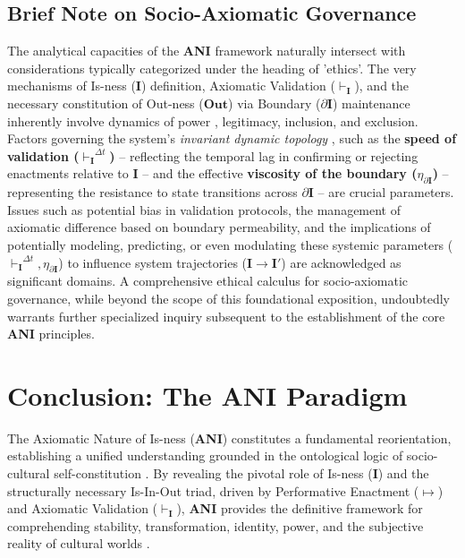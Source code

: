 \documentclass{article}
\newcommand{\ANI}{\textbf{ANI}}             %
\newcommand{\Isness}{\mathbf{I}}            %
\newcommand{\Outness}{\mathbf{Out}}         %
\newcommand{\enactment}{\ensuremath{\mapsto}} %
\newcommand{\validates}[1]{\ensuremath{\vdash_{#1}}} %
\newcommand{\boundary}[1]{\ensuremath{\partial #1}} %
\begin{document}
\subsection{Brief Note on Socio-Axiomatic Governance}

The analytical capacities of the \ANI{} framework naturally intersect with considerations typically categorized under the heading of 'ethics'. The very mechanisms of Is-ness ($\Isness$) definition, Axiomatic Validation ($\validates{\Isness}$), and the necessary constitution of Out-ness ($\Outness$) via Boundary ($\boundary{\Isness}$) maintenance inherently involve dynamics of power \citep{Foucault1972}, legitimacy, inclusion, and exclusion. Factors governing the system's \textit{invariant dynamic topology} \citep{Luhmann1995}, such as the \textbf{speed of validation ($\validates{\Isness}^{\Delta t}$)} – reflecting the temporal lag in confirming or rejecting enactments relative to $\Isness$ – and the effective \textbf{viscosity of the boundary ($\eta_{\boundary{\Isness}}$)} – representing the resistance to state transitions across $\boundary{\Isness}$ – are crucial parameters. Issues such as potential bias in validation protocols, the management of axiomatic difference based on boundary permeability, and the implications of potentially modeling, predicting, or even modulating these systemic parameters ($\validates{\Isness}^{\Delta t}, \eta_{\boundary{\Isness}}$) to influence system trajectories ($\Isness \rightarrow \Isness'$) are acknowledged as significant domains. A comprehensive ethical calculus for socio-axiomatic governance, while beyond the scope of this foundational exposition, undoubtedly warrants further specialized inquiry subsequent to the establishment of the core \ANI{} principles.

\section{Conclusion: The ANI Paradigm}

The Axiomatic Nature of Is-ness (\ANI{}) constitutes a fundamental reorientation, establishing a unified understanding grounded in the ontological logic of socio-cultural self-constitution \citep{BergerLuckmann1966, Searle1995}. By revealing the pivotal role of Is-ness ($\Isness$) and the structurally necessary Is-In-Out triad, driven by Performative Enactment ($\enactment$) and Axiomatic Validation ($\validates{\Isness}$), \ANI{} provides the definitive framework for comprehending stability, transformation, identity, power, and the subjective reality of cultural worlds \citep{Schutz1967}.
\end{document}
